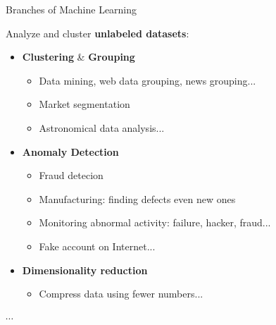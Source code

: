 \documentclass[10pt,serif,mathserif,compress,hyperref={colorlinks}]{beamer}
\begin{document}
\begin{frame}{Branches of Machine Learning}
  \begin{tcolorbox}[title={\bf Unsupervised learning}]
    Analyze and cluster \textbf{unlabeled datasets}:
    \begin{itemize}
    \item \textbf{Clustering} \& \textbf{Grouping} 
      \begin{itemize}
      \item Data mining, web data grouping, news grouping...
      \item Market segmentation
      \item Astronomical data analysis...
      \end{itemize}        
    \item \textbf{Anomaly Detection}
      \begin{itemize}
      \item Fraud detecion
      \item Manufacturing: finding defects even new ones
      \item Monitoring abnormal activity: failure, hacker, fraud...
      \item Fake account on Internet...
      \end{itemize}
    \item \textbf{Dimensionality reduction}
      \begin{itemize}
      \item Compress data using fewer numbers...
      \end{itemize}
    \end{itemize}
    \vspace*{-1mm}$\cdots$
  \end{tcolorbox}    
\end{frame}
\end{document}
